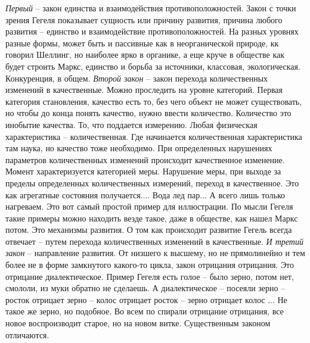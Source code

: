 \documentclass[a4paper, 12pt]{article}
\begin{document}
\textit{Первый} -- закон единства и взаимодействия противоположностей. 
Закон с точки зрения Гегеля показывает сущность или причину развития, 
причина любого развития -- единство и взаимодействие противоположностей. 
На разных уровнях разные формы, может быть и пассивные как 
в неорганической природе, кк говорил Шеллинг, но наиболее ярко 
в органике, а еще круче в обществе как будет строить Маркс, единство 
и борьба за источники, классовая, экологическая. Конкуренция, в общем. 
\textit{Второй закон} -- закон перехода количественных изменений 
в качественные. Можно проследить на уровне категорий. Первая категория 
становления, качество есть то, без чего объект не может существовать, но 
чтобы до конца понять качество, нужно ввести количество. Количество это 
инобытие качества. То, что поддается измерению. Любая физическая 
характеристика -- количественная. Где начинается количественная 
характеристика там наука, но качество тоже необходимо. При определенных 
нарушениях параметров количественных изменений происходит качественное 
изменение. Момент характеризуется категорией меры. Нарушение меры, при 
выходе за пределы определенных количественных измерений, переход 
в качественное. Это как агрегатные состояния получается.... Вода лед 
пар... А всего лишь только нагреваем. Это вот самый простой пример для 
иллюстрации. По мысли Гегеля такие примеры можно находить везде такое, 
даже в обществе, как нашел Маркс потом. Это механизмы развития. О том 
как происходит развитие Гегель всегда отвечает -- путем перехода 
количественных изменений в качественные. \textit{И третий закон} -- 
направление развития. От низшего к высшему, но не прямолинейно и тем 
более не в форме замкнутого какого-то цикла, закон отрицания отрицания. 
Это отрицание диалектическое. Пример Гегеля есть голое -- было зерно, 
потом нет, смололи, из муки обратно не сделаешь. А диалектическое -- 
посеяли зерно -- росток отрицает зерно -- колос отрицает росток -- зерно 
отрицает колос ... Не такое же зерно, но подобное. Во всем по спирали 
отрицание отрицания, все новое воспроизводит старое, но на новом витке. 
Существенным законом отличаются.
\end{document}
